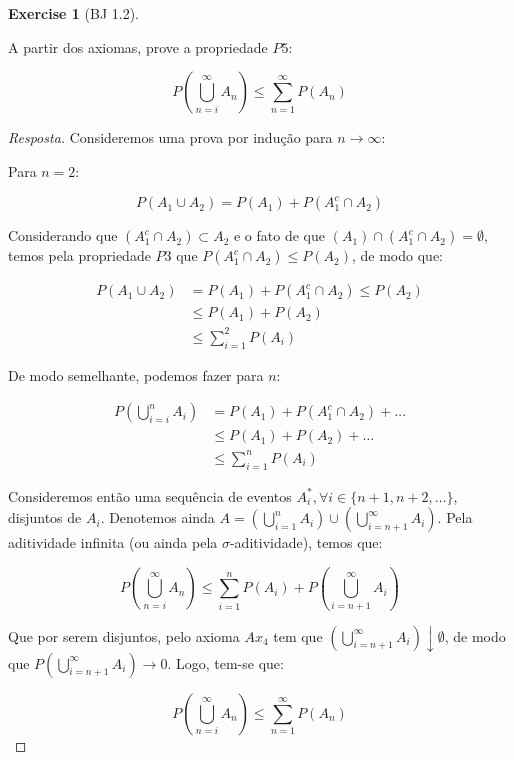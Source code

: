 \documentclass[
]{article}
\theoremstyle{definition}
\theoremstyle{definition}
\theoremstyle{definition}
\newtheorem{exercise}{Exercise}[section]
\theoremstyle{definition}
\theoremstyle{remark}
\begin{document}
\begin{exercise}[BJ 1.2]
\protect\hypertarget{exr:exbj2}{}\label{exr:exbj2}

A partir dos axiomas, prove a propriedade \(P5\):

\[
P\left(\bigcup_{n=i}^{\infty}A_{n}\right) \le \sum_{n=1}^{\infty}P(A_{n})
\]

\begin{proof}[Resposta]
Consideremos uma prova por indução para \(n \to \infty\):

Para \(n=2\):

\[
P(A_{1} \cup A_{2}) = P(A_{1}) + P(A_{1}^{c} \cap A_{2})
\]

Considerando que \((A_1^{c} \cap A_{2}) \subset A_{2}\) e o fato de que \((A_{1}) \cap (A_{1}^{c} \cap A_{2}) = \emptyset\), temos pela propriedade \(P3\) que \(P(A_1^{c} \cap A_{2}) \le P(A_{2})\), de modo que:

\begin{align*}
P(A_{1} \cup A_{2}) &= P(A_{1}) + P(A_{1}^{c} \cap A_{2}) \le P(A_{2}) \\
&\le P(A_{1}) + P(A_{2})\\
&\le \sum_{i=1}^{2}P(A_{i})
\end{align*}

De modo semelhante, podemos fazer para \(n\):

\begin{align*}
P\left(\bigcup_{i=i}^{n}A_{i}\right) &= P(A_{1}) + P(A_{1}^{c} \cap A_{2}) + \dots \\
&\le P(A_{1}) + P(A_{2}) + \dots\\
&\le \sum_{i=1}^{n}P(A_{i})
\end{align*}

Consideremos então uma sequência de eventos \(A_{i}^{*},\forall i \in \{n+1,n+2,\dots\}\), disjuntos de \(A_{i}\). Denotemos ainda \(A = \left(\bigcup_{i = 1}^{n}A_{i}\right) \cup \left(\bigcup_{i=n+1}^{\infty}A_{i}\right)\). Pela aditividade infinita (ou ainda pela \(\sigma\)-aditividade), temos que:

\[
P\left(\bigcup_{n=i}^{\infty}A_{n}\right) \le \sum_{i=1}^{n}P(A_{i}) + P\left(\bigcup_{i=n+1}^{\infty}A_{i}\right)
\]

Que por serem disjuntos, pelo axioma \(Ax_{4}\) tem que \(\left(\bigcup_{i=n+1}^{\infty}A_{i}\right)\downarrow \emptyset\), de modo que \(P\left(\bigcup_{i=n+1}^{\infty}A_{i}\right) \to 0\). Logo, tem-se que:

\[
P\left(\bigcup_{n=i}^{\infty}A_{n}\right) \le \sum_{n=1}^{\infty}P(A_{n})
\]
\end{proof}

\end{exercise}
\end{document}
